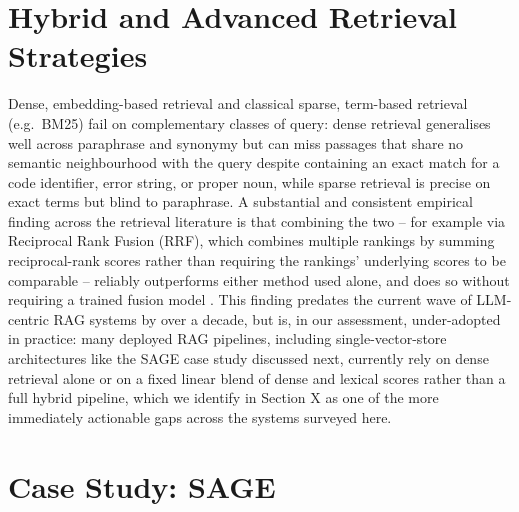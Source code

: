 \documentclass[conference]{IEEEtran}
\begin{document}
\section{Hybrid and Advanced Retrieval Strategies}

Dense, embedding-based retrieval and classical sparse, term-based
retrieval (e.g.\ BM25) fail on complementary classes of query: dense
retrieval generalises well across paraphrase and synonymy but can miss
passages that share no semantic neighbourhood with the query despite
containing an exact match for a code identifier, error string, or proper
noun, while sparse retrieval is precise on exact terms but blind to
paraphrase. A substantial and consistent empirical finding across the
retrieval literature is that combining the two -- for example via
Reciprocal Rank Fusion (RRF), which combines multiple rankings by summing
reciprocal-rank scores rather than requiring the rankings' underlying
scores to be comparable -- reliably outperforms either method used alone,
and does so without requiring a trained fusion model
\cite{cormack2009rrf}. This finding predates the current wave of
LLM-centric RAG systems by over a decade, but is, in our assessment,
under-adopted in practice: many deployed RAG pipelines, including
single-vector-store architectures like the SAGE case study discussed
next, currently rely on dense retrieval alone or on a fixed linear blend
of dense and lexical scores rather than a full hybrid pipeline, which we
identify in Section X as one of the more immediately actionable gaps
across the systems surveyed here.

\section{Case Study: SAGE}
\end{document}
